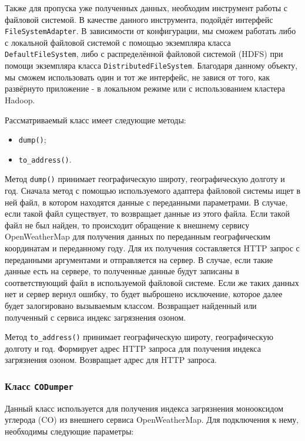 Также для пропуска уже полученных данных, необходим инструмент работы с файловой системой.
В качестве данного инструмента, подойдёт интерфейс \texttt{FileSystemAdapter}.
В зависимости от конфигурации, мы сможем работать либо с локальной файловой системой с помощью экземпляра класса \texttt{DefaultFileSystem}, либо с распределённой файловой системой (HDFS) при помощи экземпляра класса \texttt{DistributedFileSystem}.
Благодаря данному объекту, мы сможем использовать один и тот же интерфейс, не завися от того, как развёрнуто приложение - в локальном режиме или с использованием кластера Hadoop.

Рассматриваемый класс имеет следующие методы:
\begin{itemize}
\item \texttt{dump()};
\item \texttt{to\_address()}.
\end{itemize}

Метод \texttt{dump()} принимает географическую широту, географическую долготу и год.
Сначала метод с помощью используемого адаптера файловой системы ищет в ней файл, в котором находятся данные с переданными параметрами.
В случае, если такой файл существует, то возвращает данные из этого файла.
Если такой файл не был найден, то происходит обращение к внешнему сервису OpenWeatherMap для получения данных по переданным географическим координатам и переданному году.
Для их получения составляется HTTP запрос с переданными аргументами и отправляется на сервер.
В случае, если такие данные есть на сервере, то полученные данные будут записаны в соответствующий файл в используемой файловой системе.
Если же таких данных нет и сервер вернул ошибку, то будет выброшено исключение, которое далее будет залогировано вызываемым классом.
Возвращает найденный или полученный с сервиса индекс загрязнения озоном.

Метод \texttt{to\_address()} принимает географическую широту, географическую долготу и год.
Формирует адрес HTTP запроса для получения индекса загрязнения озоном.
Возвращает адрес для HTTP запроса.



\subsubsection{Класс \texttt{CODumper}}
Данный класс используется для получения индекса загрязнения монооксидом углерода ($ \text{CO} $) из внешнего сервиса OpenWeatherMap.
Для подключения к нему, необходимы следующие параметры:

